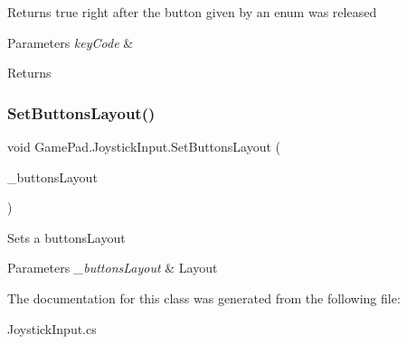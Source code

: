 Returns true right after the button given by an enum was released 


\begin{DoxyParams}{Parameters}
{\em key\+Code} & \\
\hline
\end{DoxyParams}
\begin{DoxyReturn}{Returns}

\end{DoxyReturn}
\mbox{\label{class_game_pad_1_1_joystick_input_a68adb847c36d3474e134de85e1908184}} 
\subsubsection{\texorpdfstring{SetButtonsLayout()}{SetButtonsLayout()}}
{\footnotesize\ttfamily void Game\+Pad.\+Joystick\+Input.\+Set\+Buttons\+Layout (\begin{DoxyParamCaption}\item[{\mbox{\hyperlink{class_game_pad_1_1_buttons_layout}{Buttons\+Layout}}}]{\+\_\+buttons\+Layout }\end{DoxyParamCaption})}



Sets a buttons\+Layout 


\begin{DoxyParams}{Parameters}
{\em \+\_\+buttons\+Layout} & Layout\\
\hline
\end{DoxyParams}


The documentation for this class was generated from the following file\+:\begin{DoxyCompactItemize}
\item 
Joystick\+Input.\+cs\end{DoxyCompactItemize}
